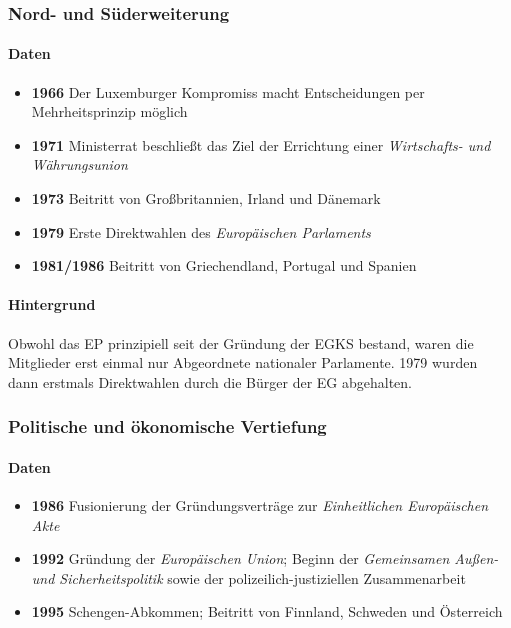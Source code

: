 \documentclass{article}
\begin{document}
	\subsubsection{Nord- und Süderweiterung}
	\paragraph{Daten}
	\begin{itemize}
		\item \textbf{1966} Der Luxemburger Kompromiss macht Entscheidungen per Mehrheitsprinzip möglich
		\item \textbf{1971} Ministerrat beschließt das Ziel der Errichtung einer \textit{Wirtschafts- und Währungsunion}
		\item \textbf{1973} Beitritt von Großbritannien, Irland und Dänemark
		\item \textbf{1979} Erste Direktwahlen des \textit{Europäischen Parlaments}
		\item \textbf{1981/1986} Beitritt von Griechendland, Portugal und Spanien
	\end{itemize}

	\paragraph{Hintergrund}
	Obwohl das EP prinzipiell seit der Gründung der EGKS bestand, waren die Mitglieder erst einmal nur Abgeordnete nationaler Parlamente. 1979 wurden dann erstmals Direktwahlen durch die Bürger der EG abgehalten.

	\subsubsection{Politische und ökonomische Vertiefung}
	\paragraph{Daten}
	\begin{itemize}
		\item \textbf{1986} Fusionierung der Gründungsverträge zur \textit{Einheitlichen Europäischen Akte}
		\item \textbf{1992} Gründung der \textit{Europäischen Union}; Beginn der \textit{Gemeinsamen Außen- und Sicherheitspolitik} sowie der polizeilich-justiziellen Zusammenarbeit
		\item \textbf{1995} Schengen-Abkommen; Beitritt von Finnland, Schweden und Österreich
	\end{itemize}
\end{document}
